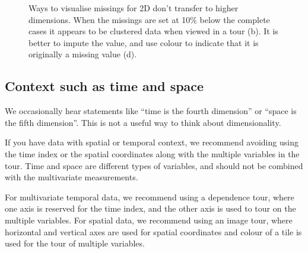 \documentclass[
  letterpaper,
]{krantz}
\begin{document}
\begin{figure}
\begin{minipage}{0.50\linewidth}
{}


\end{minipage}%
%
\begin{minipage}{0.50\linewidth}



\end{minipage}%

\caption{\label{fig-missings-pdf}Ways to visualise missings for 2D don't
transfer to higher dimensions. When the missings are set at 10\% below
the complete cases it appears to be clustered data when viewed in a tour
(b). It is better to impute the value, and use colour to indicate that
it is originally a missing value (d).}

\end{figure}%

\subsection{Context such as time and
space}\label{context-such-as-time-and-space}

We occasionally hear statements like ``time is the fourth dimension'' or
``space is the fifth dimension''. This is not a useful way to think
about dimensionality.

If you have data with spatial or temporal context, we recommend avoiding
using the time index or the spatial coordinates along with the multiple
variables in the tour. Time and space are different types of variables,
and should not be combined with the multivariate measurements.

For multivariate temporal data, we recommend using a dependence tour,
where one axis is reserved for the time index, and the other axis is
used to tour on the multiple variables. For spatial data, we recommend
using an image tour, where horizontal and vertical axes are used for
spatial coordinates and colour of a tile is used for the tour of
multiple variables.
\end{document}
